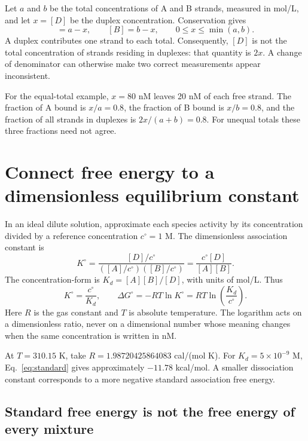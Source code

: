 Let $a$ and $b$ be the total concentrations of A and B strands, measured
in mol/L, and let $x=[D]$ be the duplex concentration. Conservation gives
\begin{equation}
[A]=a-x,\qquad [B]=b-x,\qquad 0\leq x\leq\min(a,b).
\label{eq:conservation}
\end{equation}
A duplex contributes one strand to each total. Consequently, $[D]$ is not
the total concentration of strands residing in duplexes: that quantity is
$2x$. A change of denominator can otherwise make two correct measurements
appear inconsistent.

For the equal-total example, $x=80$ nM leaves 20 nM of each free strand.
The fraction of A bound is $x/a=0.8$, the fraction of B bound is $x/b=0.8$,
and the fraction of all strands in duplexes is $2x/(a+b)=0.8$.
For unequal totals these three fractions need not agree.

\section{Connect free energy to a dimensionless equilibrium constant}

In an ideal dilute solution, approximate each species activity by its
concentration divided by a reference concentration $c^\circ=1$ M.
The dimensionless association constant is
\begin{equation}
K^\circ
=\frac{[D]/c^\circ}{([A]/c^\circ)([B]/c^\circ)}
=\frac{c^\circ[D]}{[A][B]}.
\end{equation}
The concentration-form  is
$K_d=[A][B]/[D]$, with units of mol/L. Thus
\begin{equation}
K^\circ=\frac{c^\circ}{K_d},\qquad
\Delta G^\circ=-RT\ln K^\circ
=RT\ln\left(\frac{K_d}{c^\circ}\right).
\label{eq:standard}
\end{equation}
Here $R$ is the gas constant and $T$ is absolute temperature.
The logarithm acts on a dimensionless ratio, never on a dimensional number
whose meaning changes when the same concentration is written in nM.

At $T=310.15$ K, take $R=1.98720425864083$ cal/(mol K).
For $K_d=5\times10^{-9}$ M, Eq.~\ref{eq:standard} gives approximately
$-11.78$ kcal/mol. A smaller dissociation constant corresponds to a more
negative standard association free energy.

\subsection{Standard free energy is not the free energy of every mixture}

